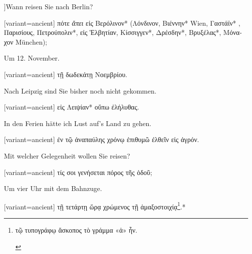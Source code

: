 ]\indent Wann reisen Sie nach Berlin?

\switchcolumn

\begin{greek}[variant=ancient]%
πότε \emph{ἄπει} εἰς Βερόλινον{*} (Λόνδινον, Βιέννην{*} \textgerman[spelling=old,babelshorthands=true]{Wien,}
Γαστάϊν{*} , Παρισίους, Πετρούπολιν{*}, εἰς Ἑλβητίαν, Κίσσιγγεν{*},
Δρέσδην{*}, Βρυξέλας{*}, Μόναχον \textgerman[spelling=old,babelshorthands=true]{München});

\end{greek}%
\switchcolumn*

Um 12. November.

\switchcolumn

\begin{greek}[variant=ancient]%
τῇ δωδεκάτῃ Νοεμβρίου.

\end{greek}%
\switchcolumn*

Nach Leipzig sind Sie bis\textcompwordmark{}her noch nicht gekommen.

\switchcolumn

\begin{greek}[variant=ancient]%
εἰς Λειψίαν{*} οὔπω ἐλήλυθας.

\end{greek}%
\switchcolumn*

In den Ferien hätte ich Lust auf's Land zu gehen.

\switchcolumn

\begin{greek}[variant=ancient]%
ἐν τῷ ἀναπαύλης χρόνῳ ἐπιθυμῶ ἐλθεῖν εἰς ἀγρόν.

\end{greek}%
\switchcolumn*

Mit welcher Gelegenheit wollen Sie reisen?

\switchcolumn

\begin{greek}[variant=ancient]%
τίς σοι γενήσεται πόρος τῆς ὁδοῦ;

\end{greek}%
\switchcolumn*

Um vier Uhr mit dem Bahnzuge.

\switchcolumn

\begin{greek}[variant=ancient]%
τῇ τετάρτῃ ὥρᾳ χρώμενος τῇ ἁμαξοστοιχίᾳ\footnote{\begin{latin}%
\textgreek[variant=ancient]{τῷ τυπογράφῳ ἄσκοπος τὸ γράμμα «ἁ» ἦν.}\end{latin}%
}.{*}

\end{greek}%
\switchcolumn*

